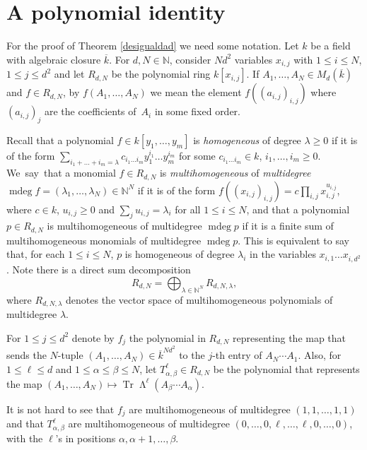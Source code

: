 \documentclass[JEP,XML,SOM,Unicode,NoEqCountersInSection]{cedram}
\theoremstyle{plain}
\theoremstyle{definition}
\newcommand{\NN}{\mathbb{N}}
\DeclareMathOperator{\mdeg}{mdeg}
\DeclareMathOperator{\Tr}{Tr}
\DeclareMathOperator{\Wedge}{\mathsf{\Lambda}}
\begin{document}
\section{A polynomial identity}\label{secciontres}

For the proof of Theorem \ref{desigualdad} we need some notation. Let $k$ be a field with algebraic closure $\overline{k}$. For $d,N\in \NN$, consider $Nd^2$ variables $x_{i,j}$ with $1\leq i\leq N$, $1 \leq j \leq d^{2}$ and let $R_{d,N}$ be the polynomial ring $k[x_{i,j}]$. If $A_1,\dots,A_N \in M_{d}(\overline{k})$ and $f\in R_{d,N}$, by $f(A_1,\dots,A_N)$ we mean the element $f((a_{i,j})_{i,j})$ where $(a_{i,j})_{j}$ are the coefficients of~$A_i$ in some fixed order.

Recall that a polynomial $f\in k[y_1,\dots,y_m]$ is \textit{homogeneous} of degree $\lambda\geq 0$ if it is of the form $\sum_{i_1+\dots+i_m=\lambda}{c_{i_1\dots i_m}y_{1}^{i_1}\dots y_{m}^{i_m}}$ for some $c_{i_1\dots i_m}\in k$, \hbox{$i_1,\dots,i_m\geq 0$}. We~say~that a monomial $f\in R_{d,N}$ is \textit{multihomogeneous} of \textit{multidegree} $\mdeg{f}=(\lambda_1,\dots,\lambda_N) \in {\NN}^{N}$ if it is of the form $f((x_{i,j})_{i,j})=c\prod_{i,j}x^{u_{i,j}}_{i,j}$, where $c\in k$, $u_{i,j}\geq 0$ and $\sum_{j}{u_{i,j}}=\lambda_{i}$ for all $1\leq i\leq N$, and that a polynomial $p\in R_{d,N}$ is multihomogeneous of multidegree $\mdeg{p}$ if it is a finite sum of multihomogeneous monomials of multidegree $\mdeg{p}$. This is equivalent to say that, for each $1\leq i\leq N$, $p$ is homogeneous of degree $\lambda_i$ in the variables $x_{i,1} \dots x_{i,d^2}$. Note there is a direct sum decomposition
\begin{equation}\label{directsum}
R_{d,N}=\bigoplus_{\lambda \in {\NN}^{N}}{R_{d,N,\lambda}},
\end{equation} where $R_{d,N,\lambda}$ denotes the vector space of multihomogeneous polynomials of multidegree $\lambda$.

For $1\leq j\leq d^2$ denote by $f_{j}$ the polynomial in $R_{d,N}$ representing the map that sends the $N$-tuple $(A_1,\dots,A_N)\in \overline{k}^{Nd^2}$ to the $j$-th entry of $A_N\cdots A_1$. Also, for $1\leq \ell \leq d$ and $1\leq \alpha \leq \beta \leq N$, let $T^{\ell}_{\alpha,\beta} \in R_{d,N}$ be the polynomial that represents the map $(A_1,\dots,A_N)\mapsto \Tr{\Wedge^{\ell}(A_{\beta}\cdots A_{\alpha})}$.

It is not hard to see that $f_{j}$ are multihomogeneous of multidegree $(1,1,\dots,1,1)$ and that $T_{\alpha,\beta}^{\ell}$ are multihomogeneous of multidegree $(0,\dots,0,\ell,\dots,\ell,0,\dots,0)$, with the $\ell$'s in positions $\alpha,\alpha+1,\dots,\beta$.
\end{document}
